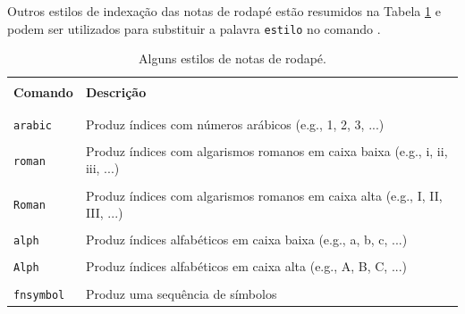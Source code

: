 Outros estilos de indexação das notas de rodapé estão resumidos na Tabela \ref{tab:estilos_notas_rodape} e podem ser utilizados para substituir a palavra {\tt estilo} no comando \texttt{\renewcommand{\thefootnote}{\estilo{footnote}}}.

\begin{table}[H]
\centering
\caption{Alguns estilos de notas de rodapé.}
\label{tab:estilos_notas_rodape}
    \begin{tabular}{p{3cm}p{8cm}}
    \hline
    \\[-0.5em]
    \textbf{Comando} & \textbf{Descrição} \\
    \\[-0.5em]
    \hline
    \hline
    \\[-0.5em]
    {\tt arabic} & Produz índices com números arábicos (e.g., 1, 2, 3, ...)\\
    \\[-0.5em]
    {\tt roman} & Produz índices com algarismos romanos em caixa baixa (e.g., i, ii, iii, ...)\\
    \\[-0.5em]
    {\tt Roman} & Produz índices com algarismos romanos em caixa alta (e.g., I, II, III, ...)\\
    \\[-0.5em]
    {\tt alph}  & Produz índices alfabéticos em caixa baixa (e.g., a, b, c, ...)\\
    \\[-0.5em]
    {\tt Alph}  & Produz índices alfabéticos em caixa alta (e.g., A, B, C, ...)\\
    \\[-0.5em]
    {\tt fnsymbol} & Produz uma sequência de símbolos \\
    \hline
    \end{tabular}
\end{table}

%
%

